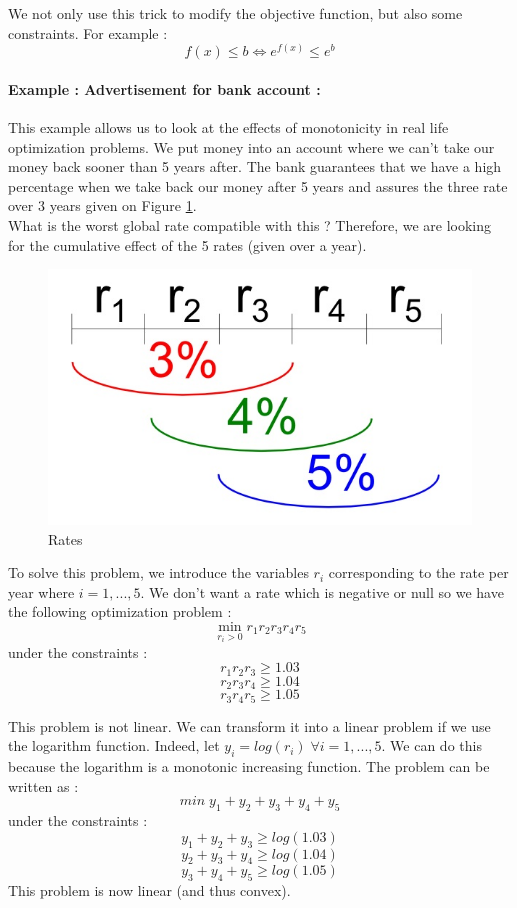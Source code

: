 \documentclass{article}
\begin{document}
We not only use this trick to modify the objective function, but also some constraints. For example : 
$$f(x) \leq b \Leftrightarrow e^{f(x)} \leq e^{b}$$

\paragraph{Example  : Advertisement for bank account :}
This example allows us to look at the effects of monotonicity in real life optimization problems.
We put money into an account where we can't take our money back sooner than 5 years after. The bank guarantees that we have a high percentage when we take back our money after 5 years and assures the three rate over 3 years given on Figure \ref{ra}.\\ What is the worst global rate compatible with this ? Therefore, we are looking for the cumulative effect of the 5 rates (given over a year). 

\begin{figure}
\centering
\includegraphics[scale=0.3]{rate.jpg}
\caption{Rates}
\label{ra}
\end{figure}

To solve this problem, we introduce the variables $r_i$ corresponding to the rate per year where $i = 1,...,5$. We don't want a rate which is negative or null so we have the following optimization problem :
$$\min \limits _{r_i > 0} r_1r_2r_3r_4r_5 $$
under the constraints : 
$$ r_1r_2r_3 \geq 1.03$$
$$ r_2r_3r_4 \geq 1.04$$
$$ r_3r_4r_5 \geq 1.05$$

This problem is not linear. We can transform it into a linear problem if we use the logarithm function. Indeed, let $y_i = log(r_i) \; \forall i=1,...,5$. We can do this because the logarithm is a monotonic increasing function. The problem can be written as : 
$$ min \; y_1 + y_2 + y_3 + y_4 + y_5$$
under the constraints : 
$$ y_1 + y_2 + y_3 \geq log(1.03)$$
$$ y_2 + y_3 + y_4 \geq log(1.04)$$
$$ y_3 + y_4 + y_5 \geq log(1.05)$$
This problem is now linear (and thus convex). \\
\end{document}
